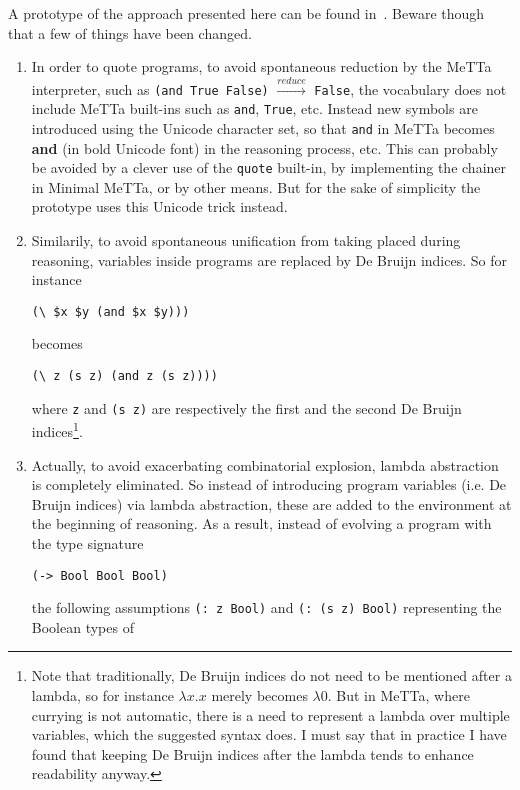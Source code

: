 \documentclass[]{report}
\begin{document}
A prototype of the approach presented here can be found
in~\cite{EvoReason}.  Beware though that a few of things have been
changed.
\begin{enumerate}
\item In order to quote programs, to avoid spontaneous reduction by
  the MeTTa interpreter, such as \texttt{(and True False)}
  $\xrightarrow{reduce}$ \texttt{False}, the vocabulary
  does not include MeTTa built-ins such as \texttt{and},
  \texttt{True}, etc.  Instead new symbols are introduced
  using the Unicode character set, so that \texttt{and} in
  MeTTa becomes \textbf{and} (in bold Unicode font) in the reasoning
  process, etc.  This can probably be avoided by a clever use of the
  \texttt{quote} built-in, by implementing the chainer in
  Minimal MeTTa, or by other means.  But for the sake of simplicity
  the prototype uses this Unicode trick instead.
\item Similarily, to avoid spontaneous unification from taking placed
during reasoning, variables inside programs are replaced by De Bruijn
indices.  So for instance
\begin{verbatim}
(\ $x $y (and $x $y)))
\end{verbatim}
becomes
\begin{verbatim}
(\ z (s z) (and z (s z))))
\end{verbatim}
where \texttt{z} and \texttt{(s z)} are
respectively the first and the second De Bruijn indices\footnote{Note
that traditionally, De Bruijn indices do not need to be mentioned
after a lambda, so for instance $\lambda x.x$ merely becomes $\lambda
0$.  But in MeTTa, where currying is not automatic, there is a need to
represent a lambda over multiple variables, which the suggested syntax
does.  I must say that in practice I have found that keeping De Bruijn
indices after the lambda tends to enhance readability anyway.}.
\item Actually, to avoid exacerbating combinatorial explosion, lambda
  abstraction is completely eliminated.  So instead of introducing
  program variables (i.e. De Bruijn indices) via lambda abstraction,
  these are added to the environment at the beginning of reasoning.
  As a result, instead of evolving a program with the type signature
\begin{verbatim}
(-> Bool Bool Bool)
\end{verbatim}
the following assumptions \texttt{(: z Bool)} and
\texttt{(: (s z) Bool)} representing the Boolean types of

\end{enumerate}
\end{document}
